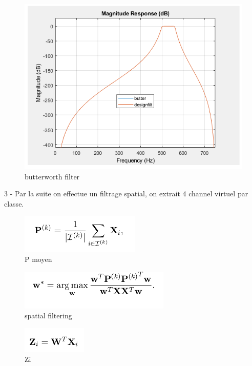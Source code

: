 \documentclass{article}
\begin{document}
\begin{figure}[H]
\begin{center}
\includegraphics[scale=0.4]{images/butterworth_filter.png}
\end{center}
\caption{butterworth filter}
\end{figure}

3 - Par la suite on effectue un filtrage spatial, on extrait 4 channel virtuel par classe.\\
\begin{figure}[H]
\begin{center}
\includegraphics[scale=0.8]{images/P_moyen.png}
\end{center}
\caption{P moyen}
\end{figure}


\begin{figure}[H]
\begin{center}
\includegraphics[scale=0.8]{images/spatial_filtering.png}
\end{center}
\caption{spatial filtering}
\end{figure}


\begin{figure}[H]
\begin{center}
\includegraphics[scale=0.8]{images/Zi.png}
\end{center}
\caption{Zi}
\end{figure}
\end{document}
